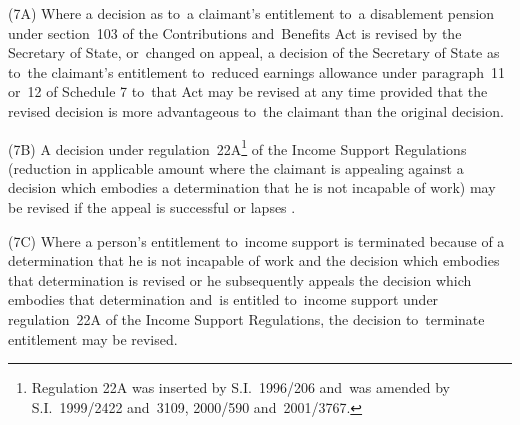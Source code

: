 \documentclass[12pt,a4paper]{article}
\begin{document}
(7A) Where a decision as to~a claimant’s entitlement to~a disablement pension under section~103 of the Contributions and~Benefits Act is revised by the Secretary of State, or~changed on appeal, a decision of the Secretary of State as to~the claimant’s entitlement to~reduced earnings allowance under paragraph~11 or~12 of Schedule 7 to~that Act may be revised at any time provided that the revised decision is more advantageous to~the claimant than the original decision.

(7B) A decision under regulation~22A\footnote{Regulation 22A was inserted by S.I.~1996/206 and~was amended by S.I.~1999/2422 and~3109, 2000/590 and~2001/3767.} of the Income Support Regulations (reduction in applicable amount where the claimant is appealing against a decision which embodies a determination that he is not incapable of work) may be revised if the appeal is successful
or lapses%
.

(7C) Where a person’s entitlement to~income support is terminated because of a determination that he is not incapable of work and 
the decision which embodies that determination is revised or  %
he subsequently appeals the decision 
which embodies  %
that determination and~is entitled to~income support under regulation~22A of the Income Support Regulations, the decision to~terminate entitlement may be revised.
\end{document}
